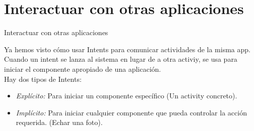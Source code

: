 \section{Interactuar con otras aplicaciones}
\begin{frame}{Interactuar con otras aplicaciones}
    \begin{block}{}
        Ya hemos visto cómo usar Intents para comunicar actividades de la misma app. Cuando un intent se lanza
        al sistema en lugar de a otra activiy, se usa para iniciar el componente apropiado de una aplicación.\\
        Hay dos tipos de Intents:
    \end{block}
    \begin{itemize}
        \pause
        \item {
            \emph{Explícito:} Para iniciar un componente específico (Un activity concreto).\pause
        }
        \item <2->{
            \emph{Implícito:} Para iniciar cualquier componente que pueda controlar la acción requerida. (Echar una foto).
        }
    \end{itemize}
\end{frame}
